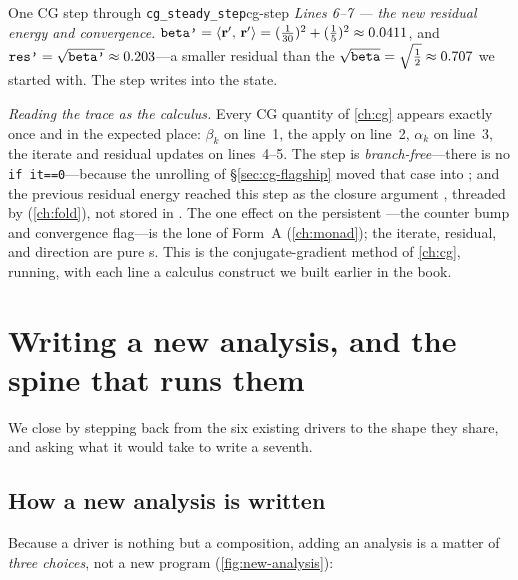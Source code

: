 \begin{workedexample}{One CG step through \texttt{cg\_steady\_step}}{cg-step}
\emph{Lines 6--7 --- the new residual energy and convergence.}
$\texttt{beta'}=\left\langle \mathbf{r}',\, \mathbf{r}'\right\rangle=(\tfrac{1}{30})^2+(\tfrac15)^2\approx0.0411$, and
$\texttt{res'}=\sqrt{\texttt{beta'}}\approx0.203$---a smaller residual than the
$\sqrt{\texttt{beta}}=\sqrt{\tfrac12}\approx0.707$ we started with. The step writes
 into the state.

\tcblower
\emph{Reading the trace as the calculus.} Every CG quantity of \cref{ch:cg} appears
exactly once and in the expected place: $\beta_k$ on line~1, the apply on line~2,
$\alpha_k$ on line~3, the iterate and residual updates on lines~4--5. The step is
\emph{branch-free}---there is no \lstinline[style=l4style]|if it==0|---because the
unrolling of \S\ref{sec:cg-flagship} moved that case into ; and
the previous residual energy reached this step as the closure argument
, threaded by  (\cref{ch:fold}), not
stored in . The one effect on the persistent ---the
counter bump and convergence flag---is the lone  of Form~A
(\cref{ch:monad}); the iterate, residual, and direction are pure s. This is
the conjugate-gradient method of \cref{ch:cg}, running, with each line a calculus
construct we built earlier in the book.
\end{workedexample}

\section{Writing a new analysis, and the spine that runs them}
\label{sec:lifecycle}

We close by stepping back from the six existing drivers to the shape they share, and
asking what it would take to write a seventh.

\subsection{How a new analysis is written}

Because a driver is nothing but a composition, adding an analysis is a matter of
\emph{three choices}, not a new program (\cref{fig:new-analysis}):


